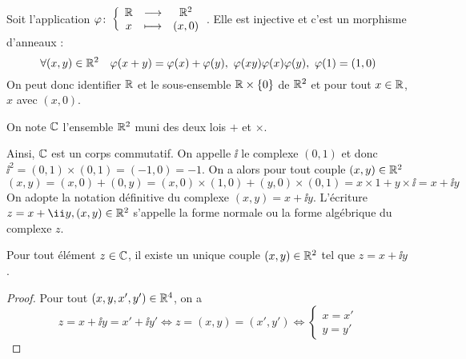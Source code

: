 Soit l'application $\varphi\colon \left\{\begin{array}{ccc} \mathbb{R} & \longrightarrow &\mathbb{R}^2\\ x & \longmapsto & (x,0) \end{array} \right.$. Elle est injective et c'est un morphisme d'anneaux :
\begin{equation}
  \forall (x,y) \in \R^2 \quad \varphi(x+y)=\varphi(x)+\varphi(y), \ \varphi(xy)\varphi(x)\varphi(y), \ \varphi(1)=(1,0)
\end{equation}
On peut donc identifier $\mathbb{R}$ et le sous-ensemble $\mathbb{R} \times \{0\}$ de $\mathbb{R}^2$ et pour tout $x \in \mathbb{R}$, $x$ avec $(x,0)$.
\begin{defdef}
  On note $\mathbb{C}$ l'ensemble $\mathbb{R}^2$ muni des deux lois $+$ et $\times$.
\end{defdef}
Ainsi, $\mathbb{C}$ est un corps commutatif. On appelle $\ii$ le complexe $(0,1)$ et donc $\ii^2 = (0,1) \times (0,1)=(-1,0)=-1$. On a alors pour tout couple $(x,y) \in \mathbb{R}^2$
\begin{equation}
  (x,y)=(x,0) + (0,y) = (x,0) \times (1,0) + (y,0) \times (0,1) = x \times 1 + y \times \ii = x+ \ii y
\end{equation}
On adopte la notation définitive du complexe $(x,y)=x+\ii y$. L'écriture $z=x+\ii y, (x,y) \in \R^2$ s'appelle la forme normale ou la forme algébrique du complexe $z$.
\begin{prop}
  Pour tout élément $z \in \mathbb{C}$, il existe un unique couple $(x,y) \in \mathbb{R}^2$ tel que $z=x+\ii y$.
\end{prop}
\begin{proof}
  Pour tout $(x,y,x',y') \in \mathbb{R}^4$, on a
  \begin{equation}
    z=x+\ii y =x'+\ii y' \Longleftrightarrow z=(x,y)=(x',y') \Longleftrightarrow \begin{cases} x=x' \\ y=y'\end{cases}
  \end{equation}

\end{proof}

